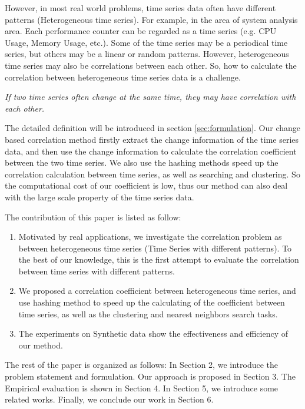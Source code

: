 However, in most real world problems, time series data often have different patterns (Heterogeneous time series). For example, in the area of system analysis area.
Each performance counter can be regarded as a time series (e.g. CPU Usage, Memory Usage, etc.).
Some of the time series may be a periodical time series, but others may be a linear or random patterns.
However, heterogeneous time series may also be correlations between each other.
So, how to calculate the correlation between heterogeneous time series data is a challenge.

\textit{If two time series often change at the same time, they may have correlation with each other.}

The detailed definition will be introduced in section \ref{sec:formulation}.
Our change based correlation method firstly extract the change information of the time series data, and then use the change information to calculate the correlation coefficient between the two time series.
We also use the hashing methods speed up the correlation calculation between time series, as well as searching and clustering.
So the computational cost of our coefficient is low, thus our method can also deal with the large scale property of the time series data.

The contribution of this paper is listed as follow:
\begin{enumerate}
\item Motivated by real applications, we investigate the correlation
problem as between heterogeneous time series (Time Series with different patterns).
To the best of our knowledge, this is the first attempt
to evaluate the correlation between time series with different patterns.

\item We proposed a correlation coefficient between heterogeneous time series, and
use hashing method to speed up the calculating of the coefficient between time series, as well as the clustering and nearest neighbors search tasks.

\item The experiments on Synthetic data show the effectiveness and efficiency of our method.
\end{enumerate}

The rest of the paper is organized as follows: In Section 2, we introduce the problem
statement and formulation. Our approach is proposed in Section 3. The Empirical evaluation is shown in Section 4. In Section 5, we introduce some
related works. Finally, we conclude our work in Section 6.



